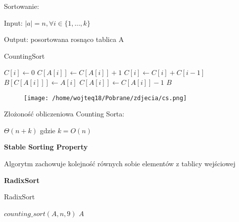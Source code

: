 \documentclass{article}
\begin{document}
    Sortowanie: \par
    Input: $|a| = n, \forall i \in \{1, ..., k\}$ \par
    Output: posortowana rosnąco tablica A \par

    \begin{algorithm}[H]
        \caption{CountingSort}
        \label{alg:countingsort}
        \begin{algorithmic}[1]
                    \State $C[i] \gets 0$
                \EndFor
                    \State $C[A[i]] \gets C[A[i]] + 1$
                \EndFor
                    \State $C[i] \gets C[i] + C[i - 1]$
                \EndFor
                    \State $B[C[A[i]]] \gets A[i]$
                    \State $C[A[i]] \gets C[A[i]] - 1$
                \EndFor
                \State \Return $B$
            \EndProcedure
        \end{algorithmic}
    \end{algorithm} \par

    \begin{figure}[H]
        \centering
        \texttt{[image: /home/wojteq18/Pobrane/zdjecia/cs.png]}
        \label{fig:example_image}
    \end{figure} \par

    Złożoność obliczeniowa Counting Sorta: \par
    $\Theta (n + k)$ gdzie $k = O(n)$ \par

    \vspace{1\baselineskip}

    \textbf{Stable Sorting Property} \par

    Algorytm zachowuje kolejność równych sobie elementów z tablicy wejściowej

    \vspace{5\baselineskip}

    \textbf{RadixSort} \par

    \begin{algorithm}[H]
        \caption{RadixSort}
        \label{alg:radixsort}
        \begin{algorithmic}[1]
                    \State $counting\_sort(A, n, 9)$
                \EndFor
                \State \Return $A$
            \EndProcedure
        \end{algorithmic}
    \end{algorithm} \par
    \vspace{1\baselineskip}
\end{document}
